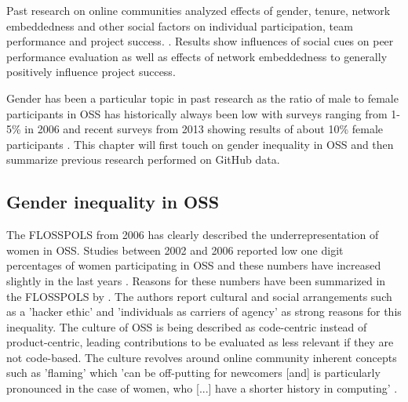 Past research on online communities analyzed effects of gender, tenure, network embeddedness and other social factors on individual participation, team performance and project success. \cite{Vasilescu:2015:GTD:2702123.2702549,vasilescu:2012:6542459,doi:10.1287/mnsc.1060.0550}. Results show influences of social cues on peer performance evaluation as well as effects of network embeddedness to generally positively influence project success.


Gender has been a particular topic in past research as the ratio of male to female participants in \ac{OSS} has historically always been low with surveys ranging from 1-5\% in 2006 and recent surveys from 2013 showing results of about 10\% female participants \cite{Vasilescu:2015:GTD:2702123.2702549,flosspols-gender:2005}. This chapter will first touch on gender inequality in \ac{OSS} and then summarize previous research performed on GitHub data.


\subsection{Gender inequality in OSS}

The \ac{FLOSSPOLS} from 2006 has clearly described the underrepresentation of women in \ac{OSS}. Studies between 2002 and 2006 reported low one digit percentages of women participating in \ac{OSS} and these numbers have increased slightly in the last years \cite{Vasilescu:2015:GTD:2702123.2702549}. Reasons for these numbers have been summarized in the \ac{FLOSSPOLS} by \citeauthor{flosspols-gender:2005}.
The authors report cultural and social arrangements such as a 'hacker ethic' and 'individuals as carriers of agency' as strong reasons for this inequality. The culture of \ac{OSS} is being described as code-centric instead of product-centric, leading contributions to be evaluated as less relevant if they are not code-based. The culture revolves around online community inherent concepts such as 'flaming' which 'can be off-putting for newcomers [and] is particularly pronounced in the case of women, who [...] have a shorter history in computing' \cite[p.6]{flosspols-gender:2005}.




